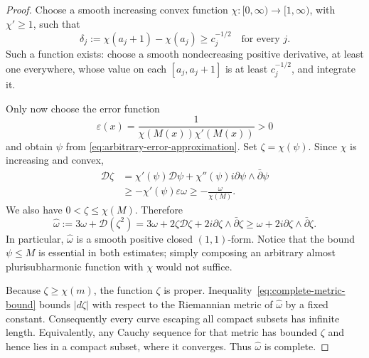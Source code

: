 \documentclass[11pt]{article}
\theoremstyle{remark}
\newcommand{\D}{\mathcal D}
\begin{document}
\begin{proof}
Choose a smooth increasing convex function
$\chi:[0,\infty)\to[1,\infty)$, with $\chi'\geq1$, such that
\begin{equation}\label{eq:large-increments}
 \delta_j:=\chi(a_j+1)-\chi(a_j)\geq c_j^{-1/2}
 \quad\text{for every }j.
\end{equation}
Such a function exists: choose a smooth nondecreasing positive
derivative, at least one everywhere, whose value on each
$[a_j,a_j+1]$ is at least $c_j^{-1/2}$, and integrate it.

Only now choose the error function
\[
 \varepsilon(x)=
 \frac{1}{\chi(M(x))\chi'(M(x))}>0
\]
and obtain $\psi$ from \eqref{eq:arbitrary-error-approximation}.
Set $\zeta=\chi(\psi)$. Since $\chi$ is increasing and convex,
\begin{align*}
 \D\zeta
 &=\chi'(\psi)\D\psi
   +\chi''(\psi)i\partial\psi\wedge\bar\partial\psi\\
 &\geq-\chi'(\psi)\varepsilon\omega
 \geq-\frac{\omega}{\chi(M)}.
\end{align*}
We also have $0<\zeta\leq\chi(M)$. Therefore
\begin{equation}\label{eq:complete-metric-bound}
 \widehat\omega
 :=3\omega+\D(\zeta^2)
 =3\omega+2\zeta\D\zeta
       +2i\partial\zeta\wedge\bar\partial\zeta
 \geq\omega+2i\partial\zeta\wedge\bar\partial\zeta.
\end{equation}
In particular, $\widehat\omega$ is a smooth positive closed
$(1,1)$-form. Notice that the bound $\psi\leq M$ is essential
in both estimates; simply composing an arbitrary almost
plurisubharmonic function with $\chi$ would not suffice.

Because $\zeta\geq\chi(m)$, the function $\zeta$ is proper.
Inequality~\eqref{eq:complete-metric-bound} bounds $|d\zeta|$
with respect to the Riemannian metric of $\widehat\omega$ by a
fixed constant. Consequently every curve escaping all compact
subsets has infinite length. Equivalently, any Cauchy sequence for
that metric has bounded $\zeta$ and hence lies in a compact
subset, where it converges. Thus $\widehat\omega$ is complete.


\end{proof}
\end{document}
